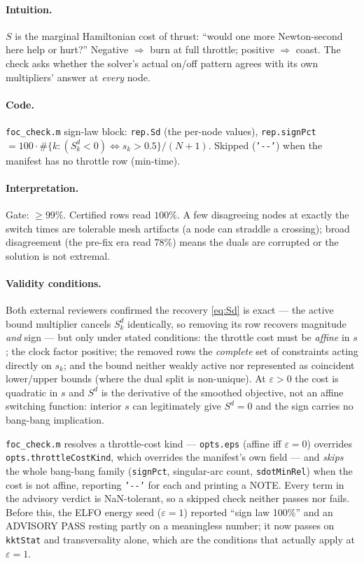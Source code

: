 \documentclass[11pt]{article}
\newcommand{\file}[1]{\texttt{#1}}
\newcommand{\code}[1]{\texttt{#1}}
\begin{document}
\paragraph{Intuition.}
$S$ is the marginal Hamiltonian cost of thrust: ``would one more Newton-second
here help or hurt?'' Negative $\Rightarrow$ burn at full throttle; positive
$\Rightarrow$ coast. The check asks whether the solver's actual on/off pattern
agrees with its own multipliers' answer at \emph{every} node.

\paragraph{Code.}
\file{foc\_check.m} sign-law block: \code{rep.Sd} (the per-node values),
\code{rep.signPct} $=100\cdot\#\{k: (S^d_k<0) \Leftrightarrow s_k>0.5\}/(N{+}1)$.
Skipped (\code{'-{}-'}) when the manifest has no throttle row (min-time).

\paragraph{Interpretation.}
Gate: $\ge 99\%$. Certified rows read $100\%$. A few disagreeing nodes at
exactly the switch times are tolerable mesh artifacts (a node can straddle a
crossing); broad disagreement (the pre-fix era read 78\%) means the duals are
corrupted or the solution is not extremal.

\paragraph{Validity conditions.}
Both external reviewers confirmed the recovery \eqref{eq:Sd} is exact --- the
active bound multiplier cancels $S^d_k$ identically, so removing its row
recovers magnitude \emph{and} sign --- but only under stated conditions:
the throttle cost must be \emph{affine} in $s$; the clock factor positive;
the removed rows the \emph{complete} set of constraints acting directly on
$s_k$; and the bound neither weakly active nor represented as coincident
lower/upper bounds (where the dual split is non-unique). At $\varepsilon>0$
the cost is quadratic in $s$ and $S^d$ is the derivative of the smoothed
objective, not an affine switching function: interior $s$ can legitimately
give $S^d=0$ and the sign carries no bang-bang implication.

\file{foc\_check.m} resolves a throttle-cost
kind --- \code{opts.eps} (affine iff $\varepsilon=0$) overrides
\code{opts.throttleCostKind}, which overrides the manifest's own field --- and
\emph{skips} the whole bang-bang family (\code{signPct}, singular-arc count,
\code{sdotMinRel}) when the cost is not affine, reporting \code{'-{}-'} for
each and printing a NOTE. Every term in the advisory verdict is NaN-tolerant,
so a skipped check neither passes nor fails. Before this, the ELFO energy seed
($\varepsilon=1$) reported ``sign law 100\%'' and an ADVISORY PASS resting
partly on a meaningless number; it now passes on \code{kktStat} and
transversality alone, which are the conditions that actually apply at
$\varepsilon=1$.
\end{document}
